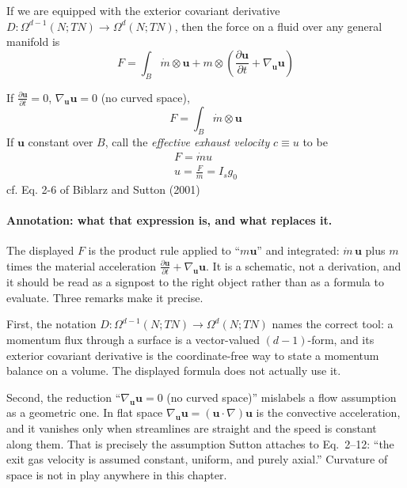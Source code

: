 If we are equipped with the exterior covariant derivative
$D: \Omega^{d-1}(N; TN) \to \Omega^d(N; TN)$, then the force on a fluid over
any general manifold is
\[
F = \int_B \dot{m} \otimes \mathbf{u} + m \otimes \left( \frac{\partial \mathbf{u}}{ \partial t} + \nabla_{\mathbf{u}} \mathbf{u} \right)
\]

If $\frac{\partial \mathbf{u}}{ \partial t} = 0$,
$\nabla_{\mathbf{u}} \mathbf{u} = 0$ (no curved space),
\[
F = \int_B \dot{m} \otimes \mathbf{u}
\]
If $\mathbf{u}$ constant over $B$, call the \emph{effective exhaust velocity}
$c \equiv u$ to be
\begin{equation}\label{Eq:ConstantEffectiveExhaustVelocity}
\begin{gathered}
F = \dot{m} u  \\
u = \frac{F}{\dot{m}} = I_s g_0
\end{gathered}
\end{equation}
cf. Eq. 2-6 of Biblarz and Sutton (2001) \cite{GSuttonOBiblarz2001}

\paragraph*{Annotation: what that expression is, and what replaces it.}
The displayed $F$ is the product rule applied to ``$m\mathbf u$'' and
integrated: $\dot m\,\mathbf u$ plus $m$ times the material acceleration
$\frac{\partial\mathbf u}{\partial t}+\nabla_{\mathbf u}\mathbf u$. It is a schematic, not a
derivation, and it should be read as a signpost to the right object rather
than as a formula to evaluate. Three remarks make it precise.

First, the notation $D:\Omega^{d-1}(N;TN)\to\Omega^d(N;TN)$ names the correct
tool: a momentum flux through a surface is a vector-valued $(d-1)$-form, and
its exterior covariant derivative is the coordinate-free way to state a
momentum balance on a volume. The displayed formula does not actually use
it.

Second, the reduction ``$\nabla_{\mathbf u}\mathbf u=0$ (no curved space)''
mislabels a flow assumption as a geometric one. In flat space
$\nabla_{\mathbf u}\mathbf u=(\mathbf u\cdot\nabla)\mathbf u$ is the
convective acceleration, and it vanishes only when streamlines are straight
and the speed is constant along them. That is precisely the assumption Sutton
attaches to Eq.~2--12: ``the exit gas velocity is assumed constant, uniform,
and purely axial.'' Curvature of space is not in play anywhere in this
chapter.

